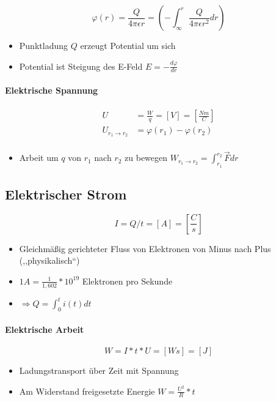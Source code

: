 $$\varphi(r) = \frac{Q}{4 \pi \epsilon r} = (-\int_\infty^r \frac{Q}{4 \pi \epsilon r^2} dr)$$

\begin{itemize}
  \item Punktladung $Q$ erzeugt Potential um sich
  \item Potential ist Steigung des E-Feld $E = - \frac{d\varphi}{dr}$
\end{itemize}

\paragraph{Elektrische Spannung}

\begin{align*}
  U                       & = \frac{W}{q} = [V] = [\frac{Nm}{C}] \\
  U_{r_1 \rightarrow r_2} & = \varphi(r_1) - \varphi(r_2)        \\
\end{align*}

\begin{itemize}
  \item Arbeit um $q$ von $r_1$ nach $r_2$ zu bewegen $W_{r_1 \rightarrow r_2} = \int_{r_1}^{r_2} \vec{F}dr$
\end{itemize}

\subsection{Elektrischer Strom}

$$I = Q/t = [A] = \left[\frac{C}{s}\right]$$

\begin{itemize}
  \item Gleichmä\ss ig gerichteter Fluss von Elektronen von Minus nach Plus (,,physikalisch``)
  \item $1A = \frac{1}{1,602} * 10^{19}$ Elektronen pro Sekunde
  \item $\Rightarrow Q = \int_0^t i(t)dt$
\end{itemize}

\paragraph{Elektrische Arbeit}

$$W = I * t * U = [Ws] = [J]$$

\begin{itemize}
  \item Ladungstransport über Zeit mit Spannung
  \item Am Widerstand freigesetzte Energie $W = \frac{U^2}{R} * t$
\end{itemize}

